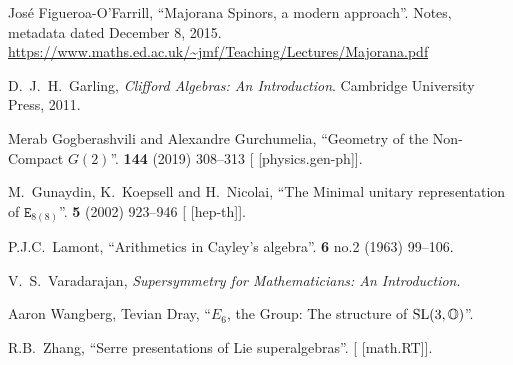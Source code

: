 \begin{thebibliography}{99}
Jos\'e Figueroa-O'Farrill,
``Majorana Spinors, a modern approach''.
Notes, metadata dated December 8, 2015.
\url{https://www.maths.ed.ac.uk/~jmf/Teaching/Lectures/Majorana.pdf}

  
D.~J.~H.~Garling,
\textit{Clifford Algebras: An Introduction}.
Cambridge University Press, 2011.

Merab Gogberashvili and Alexandre Gurchumelia,
``Geometry of the Non-Compact $G(2)$''.
 \textbf{144} (2019) 308--313
{\tt{}}
[ [physics.gen-ph]].

M.~Gunaydin, K.~Koepsell and H.~Nicolai,
``The Minimal unitary representation of $\mathtt{E}_{8(8)}$''.
 \textbf{5} (2002) 923--946
{\tt{}}
[ [hep-th]].

P.J.C.~Lamont,
``Arithmetics in Cayley's algebra''.
 \textbf{6} no.2 (1963) 99--106.
{\tt{}}
        
V.~S.~Varadarajan,
\textit{Supersymmetry for Mathematicians: An Introduction}.

Aaron Wangberg, Tevian Dray,
``$E_{6}$, the Group: The structure of $\operatorname{SL}(3,\mathbb{O})$''.

R.B.~Zhang,
``Serre presentations of Lie superalgebras''.
[ [math.RT]].

\end{thebibliography}


